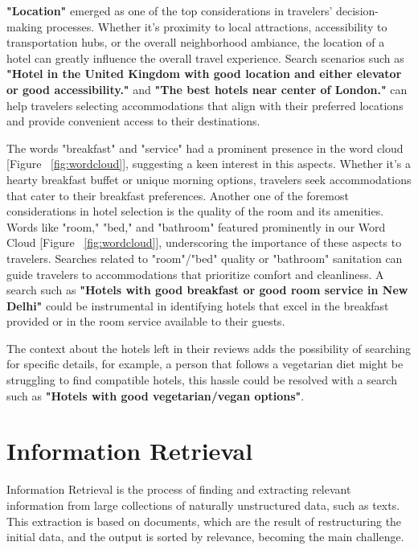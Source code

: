 \documentclass[sigconf]{acmart}
\begin{document}
\textbf{"Location"} emerged as one of the top considerations in travelers' decision-making processes. Whether it's proximity to local attractions, accessibility to transportation hubs, or the overall neighborhood ambiance, the location of a hotel can greatly influence the overall travel experience. Search scenarios such as \textbf{"Hotel in the United Kingdom with good location and either elevator or good accessibility."} and \textbf{"The best hotels near center of London."} can help travelers selecting accommodations that align with their preferred locations and provide convenient access to their destinations.

The words "breakfast" and "service" had a prominent presence in the word cloud [Figure ~\ref{fig:wordcloud}], suggesting a keen interest in this aspects. Whether it's a hearty breakfast buffet or unique morning options, travelers seek accommodations that cater to their breakfast preferences. Another one of the foremost considerations in hotel selection is the quality of the room and its amenities. Words like "room," "bed," and "bathroom" featured prominently in our Word Cloud [Figure ~\ref{fig:wordcloud}], underscoring the importance of these aspects to travelers. Searches related to "room"/"bed" quality or "bathroom" sanitation can guide travelers to accommodations that prioritize comfort and cleanliness. A search such as \textbf{"Hotels with good breakfast or good room service in New Delhi"} could be instrumental in identifying hotels that excel in the breakfast provided or in the room service available to their guests.

The context about the hotels left in their reviews adds the possibility of searching for specific details, for example, a person that follows a vegetarian diet might be struggling to find compatible hotels, this hassle could be resolved with a search such as \textbf{"Hotels with good vegetarian/vegan options"}.

\section{ Information Retrieval}

Information Retrieval \cite{Information_Retrieval} is the process of finding and extracting relevant information from large collections of naturally unstructured data, such as texts. This extraction is based on documents, which are the result of restructuring the initial data, and the output is sorted by relevance, becoming the main challenge.
\end{document}
